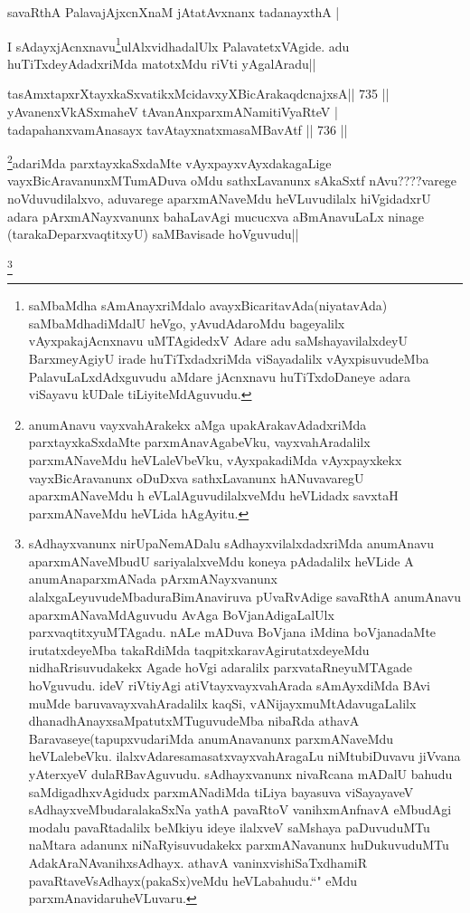 \begin{shl}
savaRthA PalavajAjxcnXnaM jAtatAvxnanx tadanayxthA | \\
\end{shl}

\begin{artha}
I sAdayxjAcnxnavu\footnote{saMbaMdha sAmAnayxriMdalo avayxBicaritavAda(niyatavAda) saMbaMdhadiMdalU heVgo, yAvudAdaroMdu bageyalilx vAyxpakajAcnxnavu uMTAgidedxV Adare adu saMshayavilalxdeyU BarxmeyAgiyU irade huTiTxdadxriMda viSayadalilx vAyxpisuvudeMba  PalavuLaLxdAdxguvudu aMdare jAcnxnavu huTiTxdoDaneye adara viSayavu kUDale tiLiyiteMdAguvudu.}ulAlxvidhadalUlx PalavatetxVAgide. adu huTiTxdeyAdadxriMda matotxMdu riVti yAgalAradu||
\end{artha}

\begin{shl}
tasAmxtapxrXtayxkaSxvatikxMcidavxyXBicArakaqdcnajxsA\hfill ||  735 ||  
yAvanenxVkASxmaheV tAvanAnxparxmANamitiVyaRteV | \\
tadapahanxvamAnasayx tavAtayxnatxmasaMBavAtf \hfill||  736 ||  
\end{shl}

\begin{artha}
\footnote{anumAnavu vayxvahArakekx aMga upakArakavAdadxriMda parxtayxkaSxdaMte parxmAnavAgabeVku, vayxvahAradalilx parxmANaveMdu heVLaleVbeVku, vAyxpakadiMda vAyxpayxkekx vayxBicAravanunx oDuDxva sathxLavanunx hANuvavaregU aparxmANaveMdu h eVLalAguvudilalxveMdu heVLidadx savxtaH parxmANaveMdu heVLida hAgAyitu.}adariMda parxtayxkaSxdaMte vAyxpayxvAyxdakagaLige vayxBicAravanunxMTumADuva oMdu sathxLavanunx sAkaSxtf nAvu????varege noVduvudilalxvo, aduvarege aparxmANaveMdu heVLuvudilalx hiVgidadxrU adara pArxmANayxvanunx bahaLavAgi mucucxva aBmAnavuLaLx ninage (tarakaDeparxvaqtitxyU) saMBavisade hoVguvudu||
\end{artha}

\begin{artha}
\footnote{sAdhayxvanunx nirUpaNemADalu sAdhayxvilalxdadxriMda anumAnavu aparxmANaveMbudU sariyalalxveMdu koneya pAdadalilx heVLide A anumAnaparxmANada pArxmANayxvanunx alalxgaLeyuvudeMbaduraBimAnaviruva pUvaRvAdige savaRthA anumAnavu aparxmANavaMdAguvudu AvAga BoVjanAdigaLalUlx parxvaqtitxyuMTAgadu. nALe mADuva BoVjana iMdina boVjanadaMte irutatxdeyeMba takaRdiMda taqpitxkaravAgirutatxdeyeMdu nidhaRrisuvudakekx Agade hoVgi adaralilx parxvataRneyuMTAgade hoVguvudu. ideV riVtiyAgi atiVtayxvayxvahArada sAmAyxdiMda BAvi muMde baruvavayxvahAradalilx kaqSi, vANijayxmuMtAdavugaLalilx dhanadhAnayxsaMpatutxMTuguvudeMba nibaRda athavA Baravaseye(tapupxvudariMda anumAnavanunx parxmANaveMdu heVLalebeVku. ilalxvAdaresamasatxvayxvahAragaLu niMtubiDuvavu jiVvana yAterxyeV dulaRBavAguvudu. sAdhayxvanunx nivaRcana mADalU bahudu saMdigadhxvAgidudx parxmANadiMda tiLiya bayasuva viSayayaveV sAdhayxveMbudaralakaSxNa yathA pavaRtoV vanihxmAnfnavA eMbudAgi modalu pavaRtadalilx beMkiyu ideye ilalxveV saMshaya paDuvuduMTu naMtara adanunx niNaRyisuvudakekx parxmANavanunx huDukuvuduMTu AdakAraNAvanihxsAdhayx. athavA vaninxvishiSaTxdhamiR pavaRtaveVsAdhayx(pakaSx)veMdu heVLabahudu.``\stext" eMdu parxmAnavidaruheVLuvaru.}
\end{artha}

